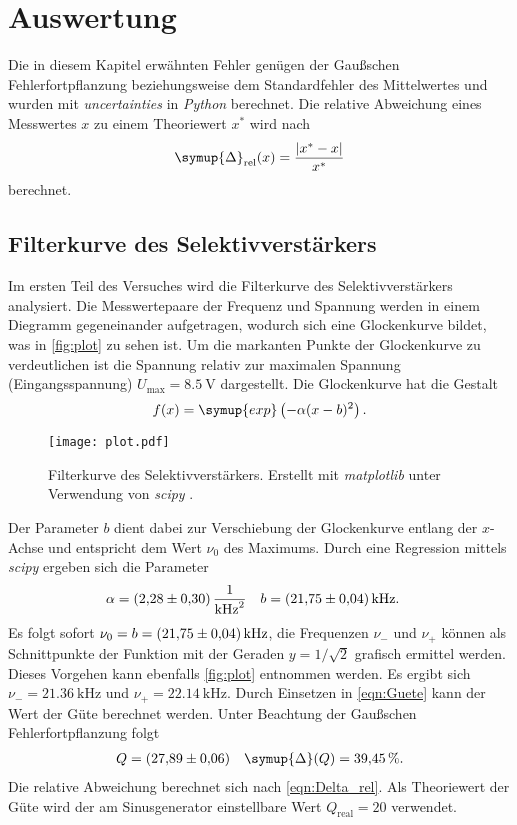 \section{Auswertung}
\label{sec:Auswertung}
Die in diesem Kapitel erwähnten Fehler genügen der Gaußschen Fehlerfortpflanzung beziehungsweise dem Standardfehler des Mittelwertes und wurden mit \textit{uncertainties}
\cite{uncertainties} in \textit{Python} berechnet. Die relative Abweichung eines Messwertes $x$ zu einem Theoriewert $x^*$ wird nach 
\begin{equation}
  \label{eqn:Delta_rel}
  \symup{\Delta}_\text{rel}(x) = \frac{|x^* - x|}{x^*}
\end{equation}
berechnet.

\subsection{Filterkurve des Selektivverstärkers}
\label{subsec:A_Filterkurve}
Im ersten Teil des Versuches wird die Filterkurve des Selektivverstärkers analysiert. Die Messwertepaare der Frequenz und Spannung werden in einem Diegramm gegeneinander
aufgetragen, wodurch sich eine Glockenkurve bildet, was in \autoref{fig:plot} zu sehen ist. Um die markanten Punkte der Glockenkurve zu verdeutlichen ist die Spannung 
relativ zur maximalen Spannung (Eingangsspannung) $U_\text{max} = \qty{8.5}{\volt}$ dargestellt. 
Die Glockenkurve hat die Gestalt
\begin{equation*}
  \label{eqn:Gaussglocke}
  f(x) = \symup{exp}\left(-\alpha(x-b)^2\right).
\end{equation*}

\begin{figure}[H]
  \centering
  \texttt{[image: plot.pdf]}
  \caption{Filterkurve des Selektivverstärkers. Erstellt mit \textit{matplotlib} \cite{matplotlib} unter Verwendung von \textit{scipy} \cite{scipy}.}
  \label{fig:plot}
\end{figure}

Der Parameter $b$ dient dabei zur Verschiebung der Glockenkurve entlang der $x$-Achse und entspricht dem Wert $\nu_0$ des Maximums. 
Durch eine Regression mittels \textit{scipy} \cite{scipy} ergeben sich die Parameter
\begin{align}
  \label{eqn:Parameter}
  \alpha &= \qty{2.28 +- 0.3}{\per\kilo\hertz\squared} & b &= \qty{21.75 +- 0.04}{\kilo\hertz}.
\end{align}
Es folgt sofort $\nu_0 = b = \qty{21.75 +- 0.04}{\kilo\hertz}$, die Frequenzen $\nu_-$ und $\nu_+$ können als Schnittpunkte der Funktion mit der Geraden $y = 1/\sqrt{2}$
grafisch ermittel werden. Dieses Vorgehen kann ebenfalls \autoref{fig:plot} entnommen werden. 
Es ergibt sich $\nu_- = \qty{21.36}{\kilo\hertz}$ und $\nu_+ = \qty{22.14}{\kilo\hertz}$. 
Durch Einsetzen in \autoref{eqn:Guete} kann der Wert der Güte berechnet werden.
Unter Beachtung der Gaußschen Fehlerfortpflanzung folgt
\begin{align*}
  Q &= \qty{27.89 +- 0.06}{} & \symup{\Delta}(Q) = \qty{39.45}{\percent}.
\end{align*}
Die relative Abweichung berechnet sich nach \autoref{eqn:Delta_rel}. Als Theoriewert der Güte wird der am Sinusgenerator einstellbare Wert $Q_\text{real} = 20$ verwendet.

